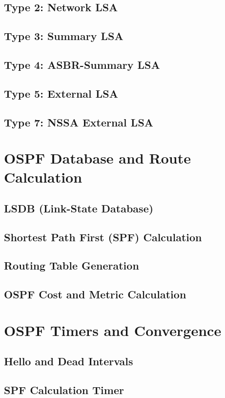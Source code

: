 \documentclass{book}
\begin{document}
    \section{Type 2: Network LSA}
    \section{Type 3: Summary LSA}
    \section{Type 4: ASBR-Summary LSA}
    \section{Type 5: External LSA}
    \section{Type 7: NSSA External LSA}
    
\chapter{OSPF Database and Route Calculation}
    \section{LSDB (Link-State Database)}
    \section{Shortest Path First (SPF) Calculation}
    \section{Routing Table Generation}
    \section{OSPF Cost and Metric Calculation}
    
\chapter{OSPF Timers and Convergence}
    \section{Hello and Dead Intervals}
    \section{SPF Calculation Timer}
\end{document}

